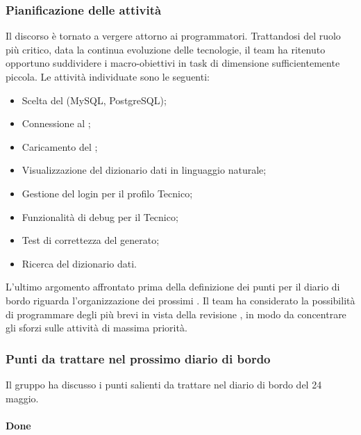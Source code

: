 \subsubsection{Pianificazione delle attività}
\par Il discorso è tornato a vergere attorno ai programmatori. Trattandosi del ruolo più critico, data la continua evoluzione delle tecnologie, il team ha ritenuto opportuno suddividere i macro-obiettivi in task di dimensione sufficientemente piccola. Le attività individuate sono le seguenti:
\begin{itemize}
	\item Scelta del  (MySQL, PostgreSQL);
	\item Connessione al ;
	\item Caricamento del ;
	\item Visualizzazione del dizionario dati in linguaggio naturale;
	\item Gestione del login per il profilo Tecnico; 
	\item Funzionalità di debug per il Tecnico;
	\item Test di correttezza del  generato;
	\item Ricerca del dizionario dati.
\end{itemize}
\par L'ultimo argomento affrontato prima della definizione dei punti per il diario di bordo riguarda l'organizzazione dei prossimi . Il team ha considerato la possibilità di programmare degli  più brevi in vista della revisione , in modo da concentrare gli sforzi sulle attività di massima priorità.

\subsubsection{Punti da trattare nel prossimo diario di bordo}
\par Il gruppo ha discusso i punti salienti da trattare nel diario di bordo del 24 maggio.
\paragraph{Done}
